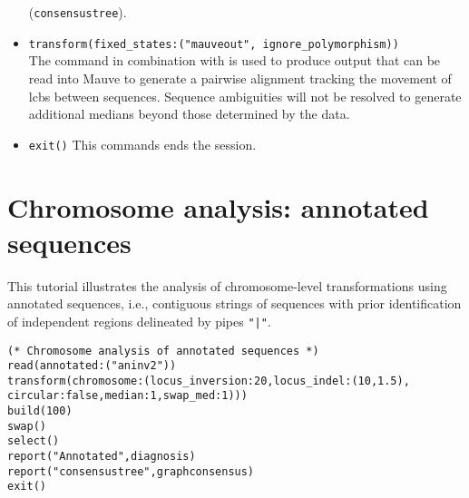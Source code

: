 \begin{itemize}
(\texttt{consensustree}). 
\item \texttt{transform(fixed\_states:("mauveout", ignore\_polymorphism))}  \\The {} command 
in combination with  is used to produce output that 
can be read into Mauve to generate a pairwise alignment tracking the movement of lcbs between sequences. 
Sequence ambiguities will not be resolved to generate additional medians beyond those determined by the data.
\item \texttt{exit()} This commands ends the \poy session.
\end{itemize}

\section{Chromosome analysis: annotated sequences}{\label{tutorial 7}}

This tutorial illustrates the analysis of chromosome-level transformations using 
annotated sequences, i.e., contiguous strings of sequences with prior 
identification of independent regions delineated by pipes  \texttt{"|"}. 

\begin{verbatim}
(* Chromosome analysis of annotated sequences *)
read(annotated:("aninv2"))
transform(chromosome:(locus_inversion:20,locus_indel:(10,1.5),
circular:false,median:1,swap_med:1)))
build(100)
swap()
select()
report("Annotated",diagnosis)
report("consensustree",graphconsensus)
exit()
\end{verbatim}

